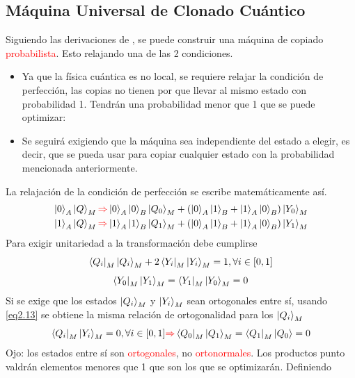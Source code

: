 \documentclass{book}
\begin{document}
\subsection{Máquina Universal de Clonado Cuántico}
Siguiendo las derivaciones de \textcolor{red}{\cite{bib1}}, se puede construir una máquina de copiado \textcolor{Red}{probabilista}. Esto relajando una de las 2 condiciones.
\begin{itemize}
    \item Ya que la física cuántica es no local, se requiere relajar la condición de perfección, las copias no tienen por que llevar al mismo estado con probabilidad 1. Tendrán una probabilidad menor que 1 que se puede optimizar:
    \item Se seguirá exigiendo que la máquina sea independiente del estado a elegir, es decir, que se pueda usar para copiar cualquier estado con la probabilidad mencionada anteriormente. 
\end{itemize}
La relajación de la condición de perfección se escribe matemáticamente así.
\begin{equation}\label{eq2.13}\begin{aligned}{\ket{0}_A\ket{Q}_M\textcolor{red}{\Rightarrow} \ket{0}_A\ket{0}_B\ket{Q_0}_M+(\ket{0}_A\ket{1}_B+\ket{1}_A\ket{0}_B)\ket{Y_0}_M} \\ {\ket{1}_A\ket{Q}_M\textcolor{red}{\Rightarrow} \ket{1}_A\ket{1}_B\ket{Q_1}_M+(\ket{0}_A\ket{1}_B+\ket{1}_A\ket{0}_B)\ket{Y_1}_M}\end{aligned}\end{equation}
Para exigir unitariedad a la transformación debe cumplirse
\begin{equation}\label{eq2.14}{\bra{Q_i}_M\ket{Q_i}_M+2\bra{Y_i}_M\ket{Y_i}_M=1, \forall i \in[0,1]}\end{equation}
\begin{equation}\label{eq2.15}{\bra{Y_0}_M\ket{Y_1}_M=\bra{Y_1}_M\ket{Y_0}_M=0}\end{equation}
Si se exige que los estados $\ket{Q_i}_M$ y $\ket{Y_i}_M$ sean ortogonales entre sí, usando \textcolor{blue}{\ref{eq2.13}} se obtiene la misma relación de ortogonalidad para los $\ket{Q_i}_M$
\begin{equation}\label{eq2.16}{\bra{Q_i}_M\ket{Y_i}_M=0, \forall i \in[0,1] \textcolor{red}{\Rightarrow} \bra{Q_0}_M\ket{Q_1}_M=\bra{Q_1}_M\ket{Q_0}=0}\end{equation}
Ojo: los estados entre sí son \textcolor{Red}{ortogonales}, no \textcolor{Red}{ortonormales}. Los productos punto valdrán elementos menores que 1 que son los que se optimizarán. Definiendo 
\end{document}
